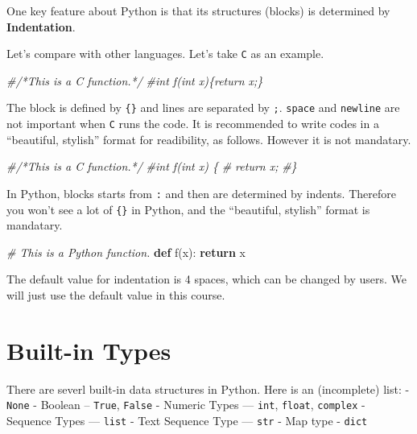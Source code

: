 \documentclass[
]{book}
\newenvironment{Shaded}{\begin{snugshade}}{\end{snugshade}}
\newcommand{\CommentTok}[1]{\textcolor[rgb]{0.56,0.35,0.01}{\textit{#1}}}
\newcommand{\ControlFlowTok}[1]{\textcolor[rgb]{0.13,0.29,0.53}{\textbf{#1}}}
\newcommand{\KeywordTok}[1]{\textcolor[rgb]{0.13,0.29,0.53}{\textbf{#1}}}
\newcommand{\NormalTok}[1]{#1}
\begin{document}
One key feature about Python is that its structures (blocks) is determined by \textbf{Indentation}.

Let's compare with other languages. Let's take \texttt{C} as an example.

\begin{Shaded}
\begin{Highlighting}[]
\CommentTok{\#/*This is a C function.*/}
\CommentTok{\#int f(int x)\{return x;\}}
\end{Highlighting}
\end{Shaded}

The block is defined by \texttt{\{\}} and lines are separated by \texttt{;}. \texttt{space} and \texttt{newline} are not important when \texttt{C} runs the code. It is recommended to write codes in a ``beautiful, stylish'' format for readibility, as follows. However it is not mandatary.

\begin{Shaded}
\begin{Highlighting}[]
\CommentTok{\#/*This is a C function.*/}
\CommentTok{\#int f(int x) \{}
\CommentTok{\#    return x;}
\CommentTok{\#\}}
\end{Highlighting}
\end{Shaded}

In Python, blocks starts from \texttt{:} and then are determined by indents. Therefore you won't see a lot of \texttt{\{\}} in Python, and the ``beautiful, stylish'' format is mandatary.

\begin{Shaded}
\begin{Highlighting}[]
\CommentTok{\# This is a Python function.}
\KeywordTok{def}\NormalTok{ f(x):}
    \ControlFlowTok{return}\NormalTok{ x}
\end{Highlighting}
\end{Shaded}

The default value for indentation is 4 spaces, which can be changed by users. We will just use the default value in this course.

\hypertarget{built-in-types}{%
\section{Built-in Types}\label{built-in-types}}

There are severl built-in data structures in Python. Here is an (incomplete) list:
- \texttt{None}
- Boolean -- \texttt{True}, \texttt{False}
- Numeric Types --- \texttt{int}, \texttt{float}, \texttt{complex}
- Sequence Types --- \texttt{list}
- Text Sequence Type --- \texttt{str}
- Map type - \texttt{dict}
\end{document}
